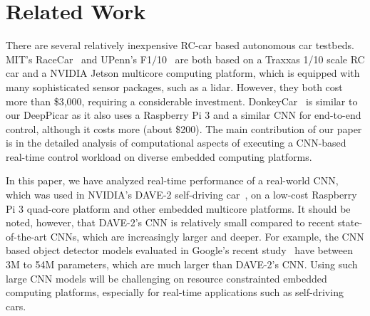 \section{Related Work}\label{sec:related}


There are several relatively inexpensive RC-car based autonomous car
testbeds. MIT's RaceCar~\cite{shin2017project} and UPenn's
F1$/$10~\cite{upennf1tenth} are both based on a Traxxas 1/10 scale RC
car and a NVIDIA Jetson multicore computing platform, which
is equipped with many sophisticated sensor packages, such as a lidar.
However, they both cost more than \$3,000, requiring a considerable
investment. DonkeyCar~\cite{donkeycar} is similar to our DeepPicar as
it also uses a Raspberry Pi 3 and a similar CNN for end-to-end
control, although it costs more (about \$200).
The main contribution of our paper is in the detailed analysis of
computational aspects of executing a CNN-based real-time control
workload on diverse embedded computing platforms.

In this paper, we have analyzed real-time performance of a real-world
CNN, which was used in NVIDIA's DAVE-2 self-driving
car~\cite{Bojarski2016}, on a low-cost Raspberry Pi 3 quad-core 
platform and other embedded multicore platforms. It should be noted,
however, that DAVE-2's CNN is relatively small compared
to recent state-of-the-art CNNs, which are increasingly larger and
deeper. For example, the CNN based object detector models evaluated in
Google's recent study~\cite{huang2017speed} have between 3M to 54M
parameters, which are much larger than DAVE-2's CNN.
Using such large CNN models will be challenging on
resource constrainted embedded computing platforms, especially for
real-time applications such as self-driving cars.

